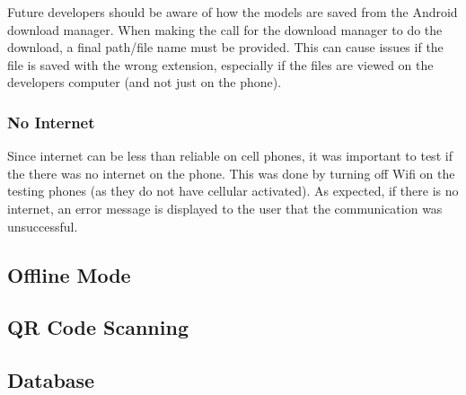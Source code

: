                 Future developers should be aware of how the models are saved from the Android download manager.  When making the call for the download manager to do the download, a final path/file name must be provided.  This can cause issues if the file is saved with the wrong extension, especially if the files are viewed on the developers computer (and not just on the phone).
        
        \subsubsection{No Internet}

            Since internet can be less than reliable on cell phones, it was important to test if the there was no internet on the phone.  This was done by turning off Wifi on the testing phones (as they do not have cellular activated).  As expected, if there is no internet, an error message is displayed to the user that the communication was unsuccessful.
        
    \subsection{Offline Mode}

    \subsection{QR Code Scanning}

    \subsection{Database}
